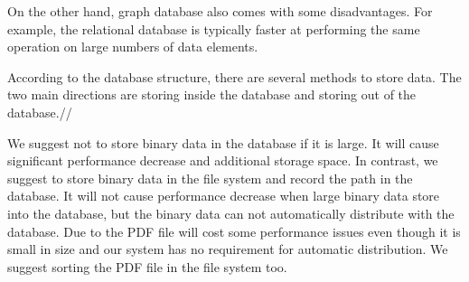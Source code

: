 \begin{enumerate}
	On the other hand, graph database also comes with some disadvantages. For example, the relational database is typically faster at performing the same operation on large numbers of data elements.\
	
    According to the database structure, there are several methods to store data. The two main directions are storing inside the database and storing out of the database.//
    
    We suggest not to store binary data in the database if it is large. It will cause significant performance decrease and additional storage space. In contrast, we suggest to store binary data in the file system and record the path in the database. It will not cause performance decrease when large binary data store into the database, but the binary data can not automatically distribute with the database. Due to the PDF file will cost some performance issues even though it is small in size and our system has no requirement for automatic distribution. We suggest sorting the PDF file in the file system too.
	
\end{enumerate}

 
	

